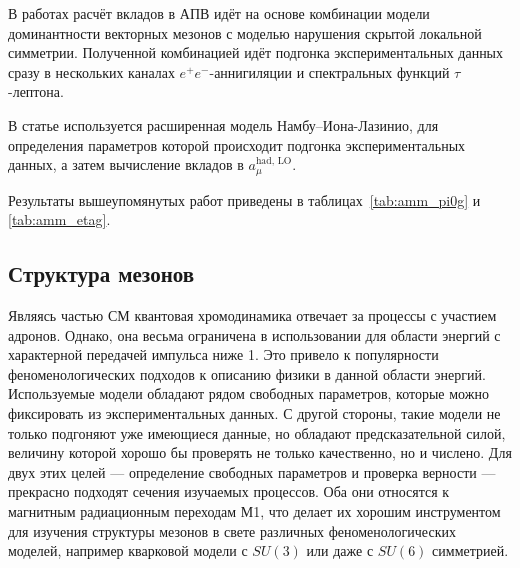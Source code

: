 В работах \cite{Benayoun:2016krn, Jegerlehner:2017gek}
расчёт вкладов в АПВ идёт на основе комбинации модели доминантности векторных мезонов
с моделью нарушения скрытой локальной симметрии.
Полученной комбинацией идёт подгонка экспериментальных данных сразу в нескольких каналах $e^+ e^-$-аннигиляции
и спектральных функций $\tau$-лептона.

В статье \cite{Ahmadov:2010hq}
используется расширенная модель Намбу--Иона-Лазинио,
для определения параметров которой происходит подгонка экспериментальных данных,
а затем вычисление вкладов в $a_\mu^{\text{had, LO}}$.

Результаты вышеупомянутых работ приведены в таблицах~\ref{tab:amm_pi0g} и \ref{tab:amm_etag}.


\subsection{Структура мезонов}
\label{meson-structures}

Являясь частью СМ квантовая хромодинамика отвечает за процессы с участием адронов. Однако, она весьма ограничена в использовании для области энергий с характерной передачей импульса ниже \SI{1}{\GeVr}.
Это привело к популярности феноменологических подходов к описанию физики в данной области энергий.
Используемые модели обладают рядом свободных параметров,
которые можно фиксировать из экспериментальных данных.
С другой стороны,
такие модели не только подгоняют уже имеющиеся данные,
но обладают предсказательной силой,
величину которой хорошо бы проверять не только качественно,
но и числено.
Для двух этих целей --- определение свободных параметров и проверка верности ---
прекрасно подходят сечения изучаемых процессов.
Оба они относятся к магнитным радиационным переходам М1,
что делает их хорошим инструментом для изучения структуры мезонов в свете различных феноменологических моделей,
например кварковой модели с $SU(3)$ или даже с $SU(6)$ симметрией.

